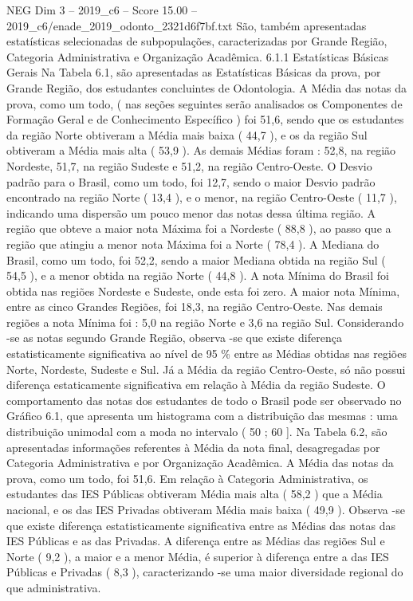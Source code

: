 \begin{textsample}{NEG Dim 3 – 2019\_c6 – Score 15.00 – 2019\_c6/enade\_2019\_odonto\_2321d6f7bf.txt}
São, também apresentadas estatísticas selecionadas de subpopulações, caracterizadas por Grande Região, Categoria Administrativa e Organização Acadêmica. 6.1.1 Estatísticas Básicas Gerais Na Tabela 6.1, são apresentadas as Estatísticas Básicas da prova, por Grande Região, dos estudantes concluintes de Odontologia.
A Média das notas da prova, como um todo, ( nas seções seguintes serão analisados os Componentes de Formação Geral e de Conhecimento Específico ) foi 51,6, sendo que os estudantes da região Norte obtiveram a Média mais baixa ( 44,7 ), e os da região Sul obtiveram a Média mais alta ( 53,9 ).
As demais Médias foram : 52,8, na região Nordeste, 51,7, na região Sudeste e 51,2, na região Centro-Oeste.
O Desvio padrão para o Brasil, como um todo, foi 12,7, sendo o maior Desvio padrão encontrado na região Norte ( 13,4 ), e o menor, na região Centro-Oeste ( 11,7 ), indicando uma dispersão um pouco menor das notas dessa última região.
A região que obteve a maior nota Máxima foi a Nordeste ( 88,8 ), ao passo que a região que atingiu a menor nota Máxima foi a Norte ( 78,4 ).
A Mediana do Brasil, como um todo, foi 52,2, sendo a maior Mediana obtida na região Sul ( 54,5 ), e a menor obtida na região Norte ( 44,8 ).
A nota Mínima do Brasil foi obtida nas regiões Nordeste e Sudeste, onde esta foi zero.
A maior nota Mínima, entre as cinco Grandes Regiões, foi 18,3, na região Centro-Oeste.
Nas demais regiões a nota Mínima foi : 5,0 na região Norte e 3,6 na região Sul.
Considerando -se as notas segundo Grande Região, observa -se que existe diferença estatisticamente significativa ao nível de 95 \% entre as Médias obtidas nas regiões Norte, Nordeste, Sudeste e Sul.
Já a Média da região Centro-Oeste, só não possui diferença estaticamente significativa em relação à Média da região Sudeste.
O comportamento das notas dos estudantes de todo o Brasil pode ser observado no Gráfico 6.1, que apresenta um histograma com a distribuição das mesmas : uma distribuição unimodal com a moda no intervalo ( 50 ; 60 ].
Na Tabela 6.2, são apresentadas informações referentes à Média da nota final, desagregadas por Categoria Administrativa e por Organização Acadêmica.
A Média das notas da prova, como um todo, foi 51,6.
Em relação à Categoria Administrativa, os estudantes das IES Públicas obtiveram Média mais alta ( 58,2 ) que a Média nacional, e os das IES Privadas obtiveram Média mais baixa ( 49,9 ).
Observa -se que existe diferença estatisticamente significativa entre as Médias das notas das IES Públicas e as das Privadas.
A diferença entre as Médias das regiões Sul e Norte ( 9,2 ), a maior e a menor Média, é superior à diferença entre a das IES Públicas e Privadas ( 8,3 ), caracterizando -se uma maior diversidade regional do que administrativa.

\end{textsample}
